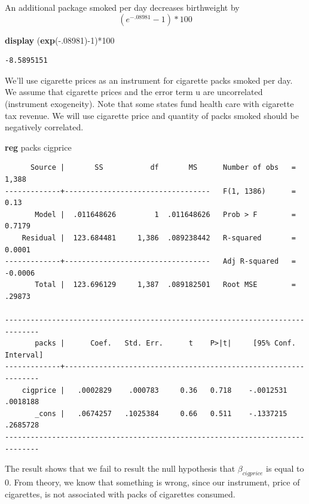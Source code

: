 \documentclass[
]{book}
\newenvironment{Shaded}{\begin{snugshade}}{\end{snugshade}}
\newcommand{\FunctionTok}[1]{\textcolor[rgb]{0.13,0.29,0.53}{\textbf{#1}}}
\newcommand{\KeywordTok}[1]{\textcolor[rgb]{0.13,0.29,0.53}{\textbf{#1}}}
\newcommand{\NormalTok}[1]{#1}
\begin{document}
An additional package smoked per day decreases birthweight by \[ (e^{-.08981}-1)*100%
\]

\begin{Shaded}
\begin{Highlighting}[]
\KeywordTok{display}\NormalTok{ (}\FunctionTok{exp}\NormalTok{({-}.08981){-}1)*100}
\end{Highlighting}
\end{Shaded}

\begin{verbatim}
-8.5895151
\end{verbatim}

We'll use cigarette prices as an instrument for cigarette packs smoked per day. We assume that cigarette prices and the error term u are uncorrelated (instrument exogeneity). Note that some states fund health care with cigarette tax revenue.
We will use cigarette price and quantity of packs smoked should be negatively
correlated.

\begin{Shaded}
\begin{Highlighting}[]
\KeywordTok{reg}\NormalTok{ packs cigprice}
\end{Highlighting}
\end{Shaded}

\begin{verbatim}
      Source |       SS           df       MS      Number of obs   =     1,388
-------------+----------------------------------   F(1, 1386)      =      0.13
       Model |  .011648626         1  .011648626   Prob > F        =    0.7179
    Residual |  123.684481     1,386  .089238442   R-squared       =    0.0001
-------------+----------------------------------   Adj R-squared   =   -0.0006
       Total |  123.696129     1,387  .089182501   Root MSE        =    .29873

------------------------------------------------------------------------------
       packs |      Coef.   Std. Err.      t    P>|t|     [95% Conf. Interval]
-------------+----------------------------------------------------------------
    cigprice |   .0002829    .000783     0.36   0.718    -.0012531    .0018188
       _cons |   .0674257   .1025384     0.66   0.511    -.1337215    .2685728
------------------------------------------------------------------------------
\end{verbatim}

The result shows that we fail to result the null hypothesis that \(\beta_{cigprice}\) is equal to 0. From theory, we know that something is wrong, since our instrument, price of cigarettes, is not associated with packs of cigarettes consumed.
\end{document}
